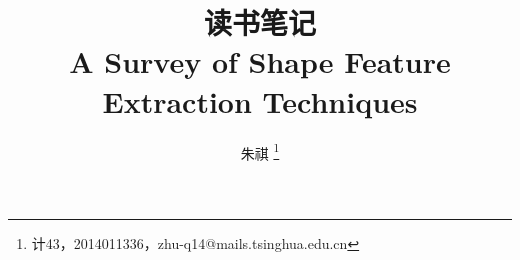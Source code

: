 \documentclass[12pt]{article}
\title{读书笔记 \\ \large A Survey of Shape Feature Extraction Techniques }
\author{
朱祺 \footnote{计43，2014011336，zhu-q14@mails.tsinghua.edu.cn}
}
\begin{document}
\maketitle{}
\end{document}
